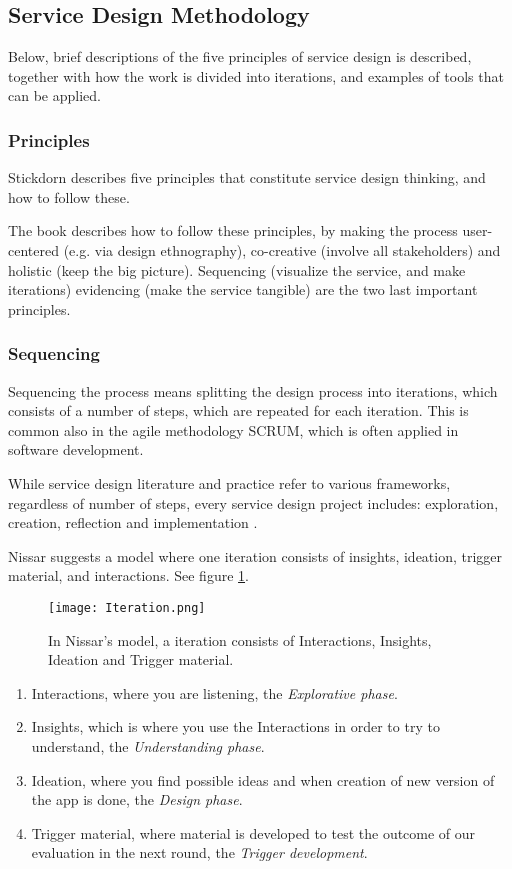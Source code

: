 \subsection{Service Design Methodology}

Below, brief descriptions of the five principles of service design is described, together with how the work is divided into iterations, and examples of tools that can be applied.

\subsubsection{Principles}
Stickdorn \cite{stickdorn} describes five principles that constitute service design thinking, and how to follow these.

The book describes how to follow these principles, by making the process user-centered (e.g. via design ethnography), co-creative (involve all stakeholders) and holistic (keep the big picture). Sequencing (visualize the service, and make iterations) evidencing (make the service tangible) are the two last important principles.

\subsubsection{Sequencing}
Sequencing the process means splitting the design process into iterations, which consists of a number of steps, which are repeated for each iteration. This is common also in the agile methodology SCRUM, which is often applied in software development.

While service design literature and practice refer to various frameworks, regardless of number of steps, every service design project includes: exploration, creation, reflection and implementation \cite{stickdorn}.

Nissar \cite{expedition-mondial} suggests a model where one iteration consists of insights, ideation, trigger material, and interactions. See figure \ref{fig:iteration}.

\begin{figure}[h]
    \centering
    \texttt{[image: Iteration.png]}
    \caption{In Nissar's model, a iteration consists of Interactions, Insights, Ideation and Trigger material.}
    \label{fig:iteration}
\end{figure}

\begin{enumerate}
\item Interactions, where you are listening, the \textit{Explorative phase}.
\item Insights, which is where you use the Interactions in order to try to understand, the \textit{Understanding phase}. %
\item Ideation, where you find possible ideas and when creation of new version of the app is done, the \textit{Design phase}.
\item Trigger material, where material is developed to test the outcome of our evaluation in the next round, the \textit{Trigger development}.
\end{enumerate}


